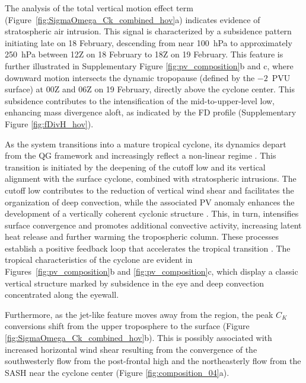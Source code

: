 \documentclass[pdflatex,sn-chicago]{sn-jnl}%
\theoremstyle{plain}
\theoremstyle{definition}
\theoremstyle{remark}
\theoremstyle{definition}
\begin{document}
The analysis of the total vertical motion effect term (Figure~\ref{fig:SigmaOmega_Ck_combined_hov}a) indicates evidence of stratospheric air intrusion. This signal is characterized by a subsidence pattern initiating late on 18 February, descending from near 100~hPa to approximately 250~hPa between 12Z on 18 February to 18Z on 19 February. This feature is further illustrated in Supplementary Figure \ref{fig:pv_composition}b and c, where downward motion intersects the dynamic tropopause (defined by the $-2$~PVU surface) at 00Z and 06Z on 19 February, directly above the cyclone center. This subsidence contributes to the intensification of the mid-to-upper-level low, enhancing mass divergence aloft, as indicated by the FD profile (Supplementary Figure \ref{fig:fDivH_hov}).

As the system transitions into a mature tropical cyclone, its dynamics depart from the QG framework and increasingly reflect a non-linear regime \citep{gonzalez2015classification}. This transition is initiated by the deepening of the cutoff low and its vertical alignment with the surface cyclone, combined with stratospheric intrusions. The cutoff low contributes to the reduction of vertical wind shear and facilitates the organization of deep convection, while the associated PV anomaly enhances the development of a vertically coherent cyclonic structure \citep{hulme2009synoptic,gonzalez2015classification}. This, in turn, intensifies surface convergence and promotes additional convective activity, increasing latent heat release and further warming the tropospheric column. These processes establish a positive feedback loop that accelerates the tropical transition \citep{emanuel1986air}. The tropical characteristics of the cyclone are evident in Figures~\ref{fig:pv_composition}b and \ref{fig:pv_composition}c, which display a classic vertical structure marked by subsidence in the eye and deep convection concentrated along the eyewall.

Furthermore, as the jet-like feature moves away from the region, the peak $C_K$ conversions shift from the upper troposphere to the surface (Figure \ref{fig:SigmaOmega_Ck_combined_hov}b). This is possibly associated with increased horizontal wind shear resulting from the convergence of the southwesterly flow from the post-frontal high and the northeasterly flow from the SASH near the cyclone center (Figure \ref{fig:composition_04}a).
\end{document}
